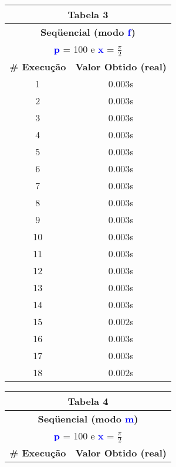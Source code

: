 \documentclass[11pt]{article}
\begin{document}
\begin{table}[!h]
	\begin{center}
		\begin{minipage}{0.48\textwidth}
			\begin{tabular}{| c | c |}
			\hline
			\multicolumn{2}{|c|}{\textbf{Tabela 3}} \\ \hline
			\multicolumn{2}{|c|}{\textbf{Seqüencial (modo \textbf{\textcolor{blue}{f}})}} \\
			\multicolumn{2}{|c|}{\textbf{\textcolor{blue}{p}} = 100 e \textbf{\textcolor{blue}{x}} = $\frac{\pi}{2}$} \\ [0.2ex]
			\hline
				\textbf{\# Execução} &  \textbf{Valor Obtido (real)} \\ \hline
				1 & 0.003s \\ \hline
				2 & 0.003s \\ \hline
				3 & 0.003s \\ \hline
				4 & 0.003s \\ \hline
				5 & 0.003s \\ \hline
				6 & 0.003s \\ \hline
				7 & 0.003s \\ \hline
				8 & 0.003s \\ \hline
				9 & 0.003s \\ \hline
				10 & 0.003s \\ \hline
				11 & 0.003s \\ \hline
				12 & 0.003s \\ \hline
				13 & 0.003s \\ \hline
				14 & 0.003s \\ \hline
				15 & 0.002s \\ \hline
				16 & 0.003s \\ \hline
				17 & 0.003s \\ \hline
				18 & 0.002s \\ \hline
			\end{tabular}
		\end{minipage}
		\begin{minipage}{0.48\textwidth}
			\begin{tabular}{| c | c |}
			\hline
			\multicolumn{2}{|c|}{\textbf{Tabela 4}} \\ \hline
			\multicolumn{2}{|c|}{\textbf{Seqüencial (modo \textbf{\textcolor{blue}{m}})}} \\
			\multicolumn{2}{|c|}{\textbf{\textcolor{blue}{p}} = 100 e \textbf{\textcolor{blue}{x}} = $\frac{\pi}{2}$} \\ [0.2ex]
			\hline
				\textbf{\# Execução} &  \textbf{Valor Obtido (real)} \\ \hline

\end{tabular}
\end{minipage}
\end{center}
\end{table}
\end{document}
